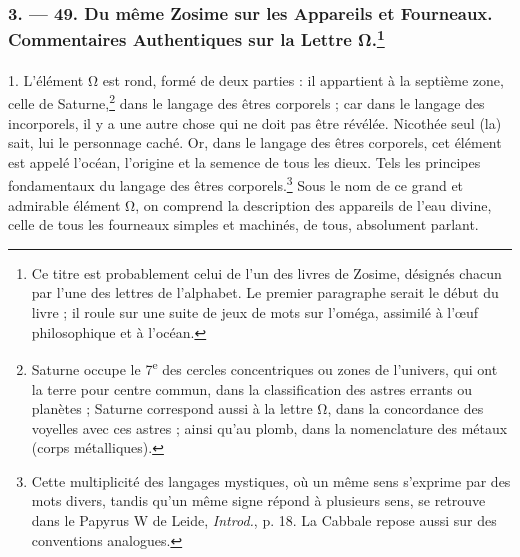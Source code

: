 \documentclass[a4paper, 11pt, oneside, polutonikogreek, french]{article}
\begin{document}
\bigskip
\centerline{\EightStarTaper}
\centerline{\EightStarTaper\EightStarTaper}
\bigskip

\subsubsection[3. --- 49. Du même Zosime sur les Appareils et Fourneaux. Commentaires Authentiques sur la Lettre Ω.]{3. --- 49. Du même Zosime sur les Appareils et Fourneaux. Commentaires Authentiques sur la Lettre Ω.\footnote{Ce titre est probablement celui de l'un des livres de Zosime, désignés chacun par l'une des lettres de l'alphabet. Le premier paragraphe serait le début du livre ; il roule sur une suite de jeux de mots sur l'oméga, assimilé à l'œuf philosophique et à l'océan.}}
\paragraph{}
1. L'élément Ω est rond, formé de deux parties : il appartient à la septième zone, celle de Saturne,\footnote{Saturne occupe le 7\textsuperscript{e} des cercles concentriques ou zones de l'univers, qui ont la terre pour centre commun, dans la classification des astres errants ou planètes ; Saturne correspond aussi à la lettre Ω, dans la concordance des voyelles avec ces astres ; ainsi qu'au plomb, dans la nomenclature des métaux (corps métalliques).} dans le langage des êtres corporels ; car dans le langage des incorporels, il y a une autre chose qui ne doit pas être révélée. Nicothée seul (la) sait, lui le personnage caché. Or, dans le langage des êtres corporels, cet élément est appelé l'océan, l'origine et la semence de tous les dieux. Tels les principes fondamentaux du langage des êtres corporels.\footnote{Cette multiplicité des langages mystiques, où un même sens s'exprime par des mots divers, tandis qu'un même signe répond à plusieurs sens, se retrouve dans le Papyrus W de Leide, \emph{Introd.}, p. 18. La Cabbale repose aussi sur des conventions analogues.} Sous le nom de ce grand et admirable élément Ω, on comprend la description des appareils de l'eau divine, celle de tous les fourneaux simples et machinés, de tous, absolument parlant.
\end{document}
